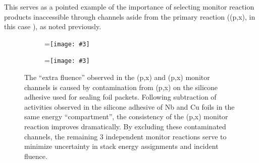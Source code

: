 \documentclass[3p]{elsarticle}
\newcommand{\subfigimg}[4][,]{%
  \setbox1=\hbox{\texttt{[image: \#3]}}%
  \leavevmode\rlap{\usebox1}%
  \rlap{\hspace*{#4pt}\raisebox{\dimexpr\ht1-2\baselineskip}{#2}}%
  \phantom{\usebox1}%
}
\begin{document}
This serves as a pointed example of the importance of selecting monitor reaction products inaccessible through channels aside from the primary reaction ((p,x), in this case ), as noted previously.








\begin{figure}
    \centering
    \begin{subfigure}[t]{0.50\textwidth}
        \centering
        \subfigimg[width=\linewidth]{a)}{./figures/after_minimization_plot_alt.pdf}{80}
         \label{fig:before_subtraction}
    \end{subfigure}%
     \begin{subfigure}[t]{0.50\textwidth}
        \centering
        \subfigimg[width=\linewidth]{b)}{./figures/after_subtraction_plot.pdf}{80}
         \label{fig:after_subtraction}
    \end{subfigure}%
    \caption{The \enquote{extra fluence} observed in the  (p,x) and (p,x) monitor channels is caused by contamination from (p,x) on the silicone adhesive used for sealing foil packets. Following subtraction of  activities observed in the silicone adhesive of Nb and Cu foils in the same energy \enquote{compartment}, the consistency of the (p,x) monitor reaction improves  dramatically.  By excluding these contaminated channels, the remaining 3 independent monitor reactions serve to minimize uncertainty in stack energy assignments and incident fluence.}
     \label{fig:na_subtraction}
\end{figure}
\end{document}
